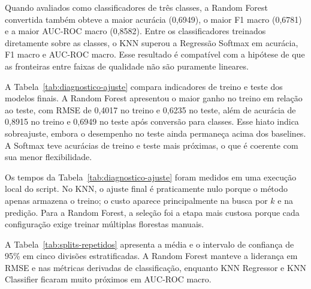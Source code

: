 \documentclass[12pt,a4paper]{article}
\begin{document}
Quando avaliados como classificadores de tr\^es classes, a Random Forest convertida tamb\'em obteve a maior acur\'acia (0,6949), o maior F1 macro (0,6781) e a maior AUC-ROC macro (0,8582). Entre os classificadores treinados diretamente sobre as classes, o KNN superou a Regress\~ao Softmax em acur\'acia, F1 macro e AUC-ROC macro. Esse resultado \'e compat\'ivel com a hip\'otese de que as fronteiras entre faixas de qualidade n\~ao s\~ao puramente lineares.

A Tabela~\ref{tab:diagnostico-ajuste} compara indicadores de treino e teste dos modelos finais. A Random Forest apresentou o maior ganho no treino em rela\c{c}\~ao ao teste, com RMSE de 0,4017 no treino e 0,6235 no teste, al\'em de acur\'acia de 0,8915 no treino e 0,6949 no teste ap\'os convers\~ao para classes. Esse hiato indica sobreajuste, embora o desempenho no teste ainda permane\c{c}a acima dos baselines. A Softmax teve acur\'acias de treino e teste mais pr\'oximas, o que \'e coerente com sua menor flexibilidade.

\begin{table}[htbp]
\centering
\caption{Diagn\'ostico de ajuste e custo computacional aproximado dos modelos finais.}
\label{tab:diagnostico-ajuste}
\end{table}

Os tempos da Tabela~\ref{tab:diagnostico-ajuste} foram medidos em uma execu\c{c}\~ao local do script. No KNN, o ajuste final \'e praticamente nulo porque o m\'etodo apenas armazena o treino; o custo aparece principalmente na busca por $k$ e na predi\c{c}\~ao. Para a Random Forest, a sele\c{c}\~ao foi a etapa mais custosa porque cada configura\c{c}\~ao exige treinar m\'ultiplas florestas manuais.

A Tabela~\ref{tab:splits-repetidos} apresenta a m\'edia e o intervalo de confian\c{c}a de 95\% em cinco divis\~oes estratificadas. A Random Forest manteve a lideran\c{c}a em RMSE e nas m\'etricas derivadas de classifica\c{c}\~ao, enquanto KNN Regressor e KNN Classifier ficaram muito pr\'oximos em AUC-ROC macro.
\end{document}
